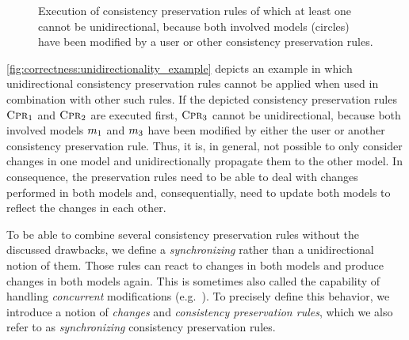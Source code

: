 \begin{figure}
    \centering
    
    \caption[Unidirectional consistency preservation in networks]{Execution of consistency preservation rules of which at least one cannot be unidirectional, because both involved models (circles) have been modified by a user or other consistency preservation rules.}
    \label{fig:correctness:unidirectionality_example}
\end{figure}

\autoref{fig:correctness:unidirectionality_example} depicts an example in which unidirectional consistency preservation rules cannot be applied when used in combination with other such rules.
If the depicted consistency preservation rules $\textsc{Cpr}_{1}$ and $\textsc{Cpr}_{2}$ are executed first, $\textsc{Cpr}_{3}$ cannot be unidirectional, because both involved models $\model{m}{1}$ and $\model{m}{3}$ have been modified by either the user or another consistency preservation rule.
Thus, it is, in general, not possible to only consider changes in one model and unidirectionally propagate them to the other model.
In consequence, the preservation rules need to be able to deal with changes performed in both models and, consequentially, need to update both models to reflect the changes in each other.

To be able to combine several consistency preservation rules without the discussed drawbacks, we define a \emph{synchronizing} rather than a unidirectional notion of them.
Those rules can react to changes in both models and produce changes in both models again.
This is sometimes also called the capability of handling \emph{concurrent} modifications (e.g.~\cite{leblebici2014IncrementalTGGSurvey-GTVMT}).
To precisely define this behavior, we introduce a notion of \emph{changes} and \emph{consistency preservation rules}, which we also refer to as \emph{synchronizing} consistency preservation rules.

